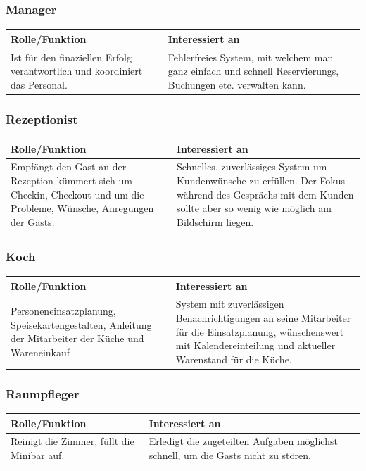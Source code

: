 \documentclass[10pt,a4paper,titlepage]{article}
\begin{document}
\subsubsection{Manager}
\begin{tabular}[t]{|p{5cm}|p{5cm}|}
    \hline
    \textbf{Rolle\slash{}Funktion} & \textbf{Interessiert an} \\
    \hline
Ist für den finaziellen Erfolg verantwortlich und koordiniert das Personal. &
	Fehlerfreies System, mit welchem man ganz einfach und schnell \Glspl{Reservierung}, Buchungen etc. verwalten kann. \\
    \hline
\end{tabular}
\subsubsection{\Gls{Rezeptionist}}
\begin{tabular}[t]{|p{5cm}|p{5cm}|}
    \hline
    \textbf{Rolle\slash{}Funktion} & \textbf{Interessiert an} \\
    \hline
Empfängt den \Gls{Gast} an der \Gls{Rezeption} kümmert sich um \Gls{Checkin}, \Gls{Checkout} und um die Probleme, Wünsche, Anregungen der \Glspl{Gast}. &
	Schnelles, zuverlässiges System um Kundenwünsche zu erfüllen. Der Fokus während des Gesprächs mit dem \Gls{Kunde}n sollte aber so wenig wie möglich am Bildschirm liegen. \\
    \hline
\end{tabular}
\subsubsection{Koch}
\begin{tabular}[t]{|p{5cm}|p{5cm}|}
    \hline
    \textbf{Rolle\slash{}Funktion} & \textbf{Interessiert an} \\
    \hline
Personeneinsatzplanung, Speisekartengestalten, Anleitung der \Gls{Mitarbeiter} der Küche und Wareneinkauf &
	System mit zuverlässigen Benachrichtigungen an seine \Gls{Mitarbeiter} für die Einsatzplanung, wünschenswert mit Kalendereinteilung und aktueller Warenstand für die Küche. \\
    \hline
\end{tabular}
\subsubsection{Raumpfleger}
\begin{tabular}[t]{|p{5cm}|p{5cm}|}
    \hline
    \textbf{Rolle\slash{}Funktion} & \textbf{Interessiert an} \\
    \hline
Reinigt die \Gls{Zimmer}, füllt die Minibar auf. &
	Erledigt die zugeteilten Aufgaben möglichst schnell, um die \Glspl{Gast} nicht zu stören. \\
    \hline
\end{tabular}
\end{document}
